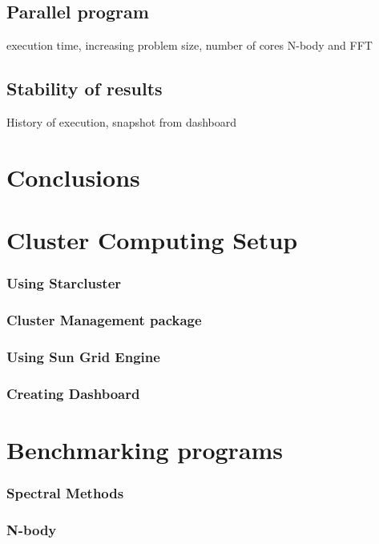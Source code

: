 \documentclass[12pt,a4paper]{report}
\begin{document}
\section{Parallel program}
execution time, increasing problem size, number of cores
N-body and FFT
\section{Stability of results}
History of execution, snapshot from dashboard

\chapter{Conclusions}


\appendix

\chapter{Cluster Computing Setup}
\subsection{Using Starcluster}
\subsection{Cluster Management package}
\subsection{Using Sun Grid Engine}
\subsection{Creating Dashboard}
\chapter{Benchmarking  programs}
\subsection{Spectral Methods}
\subsection{N-body}



\end{document}
